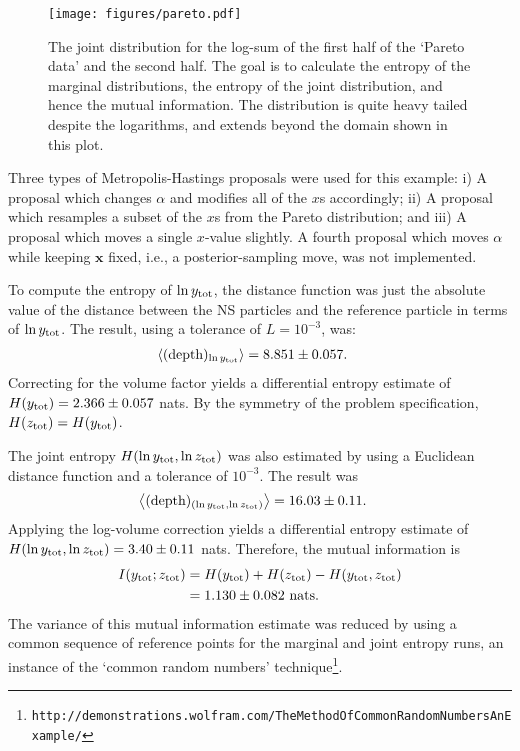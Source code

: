 \documentclass[entropy,article,accept,oneauthor,pdftex,10pt,a4paper]{mdpi}
\newcommand{\depth}{(\textnormal{depth})}
\newcommand{\ytot}{y_{\rm tot}}
\newcommand{\ztot}{z_{\rm tot}}
\begin{document}
\begin{figure}[!ht]
\centering
\texttt{[image: figures/pareto.pdf]}
\caption{The joint distribution for the log-sum of the first half of the
`Pareto data' and the second half. The goal is to calculate the entropy of
the marginal distributions, the entropy of the joint distribution, and
hence the mutual information. The distribution is quite heavy tailed despite
the logarithms, and extends beyond the domain shown in this plot.
\label{fig:pareto}}
\end{figure}

Three types of Metropolis-Hastings proposals were used for this example:
i) A proposal which changes $\alpha$ and modifies all of the $x$s accordingly;
ii) A proposal which resamples a subset of the $x$s from the Pareto
distribution; and iii) A proposal which moves a single $x$-value slightly.
A fourth proposal which moves $\alpha$ while keeping $\boldsymbol{x}$ fixed,
i.e., a posterior-sampling move, was not implemented.

To compute the entropy of $\ln \ytot$, the distance function was just the
absolute value of the distance between the NS particles and the
reference particle in terms of $\ln \ytot$. The result, using a tolerance
of $L = 10^{-3}$, was:
\begin{align}
\left<\depth_{\ln \ytot}\right> &= 8.851 \pm 0.057.
\end{align}
Correcting for the volume factor yields a differential entropy estimate
of $H(\ytot) = 2.366\pm 0.057$ nats.
By the symmetry of the problem specification, $H(\ztot) = H(\ytot)$.

The joint entropy $H(\ln \ytot, \ln \ztot)$ was also estimated by using
a Euclidean distance function and a tolerance of $10^{-3}$. The result was
\begin{align}
\left<\depth_{(\ln \ytot, \ln \ztot)}\right> &= 16.03 \pm 0.11.
\end{align}
Applying the log-volume correction yields a differential entropy estimate of
$H(\ln \ytot, \ln \ztot) = 3.40 \pm 0.11$ nats.
Therefore, the mutual information is
\begin{align}
I(\ytot; \ztot) &= H(\ytot) + H(\ztot) - H(\ytot, \ztot)\\
                &= 1.130 \pm 0.082 \textnormal{ nats}.
\end{align}
The variance of this mutual information estimate was reduced by
using a common sequence of reference points for the marginal and joint entropy
runs, an instance of the `common random numbers'
technique\footnote{\tt http://demonstrations.wolfram.com/TheMethodOfCommonRandomNumbersAnExample/}.
\end{document}
